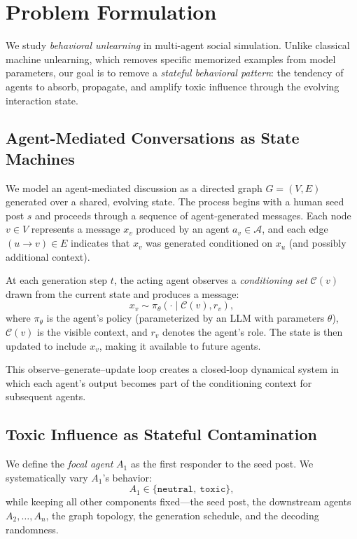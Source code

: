 \section{Problem Formulation}
\label{sec:problem}

We study \emph{behavioral unlearning} in multi-agent social simulation.
Unlike classical machine unlearning, which removes specific memorized examples from model parameters, our goal is to remove a \emph{stateful behavioral pattern}: the tendency of agents to absorb, propagate, and amplify toxic influence through the evolving interaction state.

\subsection{Agent-Mediated Conversations as State Machines}

We model an agent-mediated discussion as a directed graph $G = (V, E)$ generated over a shared, evolving state.
The process begins with a human seed post $s$ and proceeds through a sequence of agent-generated messages.
Each node $v \in V$ represents a message $x_v$ produced by an agent $a_v \in \mathcal{A}$, and each edge $(u \to v) \in E$ indicates that $x_v$ was generated conditioned on $x_u$ (and possibly additional context).

At each generation step $t$, the acting agent observes a \emph{conditioning set} $\mathcal{C}(v)$ drawn from the current state and produces a message:
\begin{equation}
    x_v \sim \pi_\theta(\cdot \mid \mathcal{C}(v), r_v),
\end{equation}
where $\pi_\theta$ is the agent's policy (parameterized by an LLM with parameters $\theta$), $\mathcal{C}(v)$ is the visible context, and $r_v$ denotes the agent's role.
The state is then updated to include $x_v$, making it available to future agents.

This observe--generate--update loop creates a closed-loop dynamical system in which each agent's output becomes part of the conditioning context for subsequent agents.

\subsection{Toxic Influence as Stateful Contamination}

We define the \emph{focal agent} $A_1$ as the first responder to the seed post.
We systematically vary $A_1$'s behavior:
\[
A_1 \in \{\texttt{neutral},\ \texttt{toxic}\},
\]
while keeping all other components fixed---the seed post, the downstream agents $A_2, \ldots, A_n$, the graph topology, the generation schedule, and the decoding randomness.

